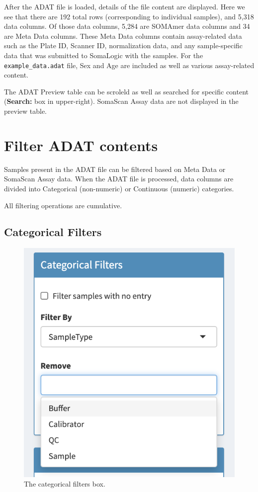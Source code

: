 \documentclass[
]{book}
\begin{document}
After the ADAT file is loaded, details of the file content are displayed. Here we see that there are 192 total rows (corresponding to individual samples), and 5,318 data columns. Of those data columns, 5,284 are SOMAmer data columns and 34 are Meta Data columns. These Meta Data columns contain assay-related data such as the Plate ID, Scanner ID, normalization data, and any sample-specific data that was submitted to SomaLogic with the samples. For the \texttt{example\_data.adat} file, Sex and Age are included as well as various assay-related content.

The ADAT Preview table can be scroleld as well as searched for specific content (\textbf{Search:} box in upper-right). SomaScan Assay data are not displayed in the preview table.

\hypertarget{filter-adat-contents}{%
\section{Filter ADAT contents}\label{filter-adat-contents}}

Samples present in the ADAT file can be filtered based on Meta Data or SomaScan Assay data. When the ADAT file is processed, data columns are divided into Categorical (non-numeric) or Continuous (numeric) categories.

All filtering operations are cumulative.

\hypertarget{categorical-filters}{%
\subsection{Categorical Filters}\label{categorical-filters}}

\begin{figure}
\centering
\includegraphics{images/CategoricalFilters.png}
\caption{The categorical filters box.}
\end{figure}
\end{document}

